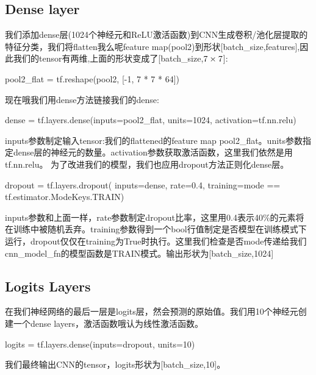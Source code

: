 \subsection{Dense layer}
我们添加dense层(1024个神经元和ReLU激活函数)到CNN生成卷积/池化层提取的特征分类，我们将flatten我么呢feature map(pool2)到形状[batch\_size,features],因此我们的tensor有两维,上面的形状变成了[batch\_size,$7\times7\time64$]:
\begin{python}
pool2_flat = tf.reshape(pool2, [-1, 7 * 7 * 64])
\end{python}
现在哦我们用dense方法链接我们的dense:
\begin{python}
dense = tf.layers.dense(inputs=pool2_flat, units=1024, activation=tf.nn.relu)
\end{python}
inputs参数制定输入tensor:我们的flattened的feature map pool2\_flat。units参数指定dense层的神经元的数量。activation参数获取激活函数，这里我们依然是用tf.nn.relu。
为了改进我们的模型，我们也应用dropout方法正则化dense层。
\begin{python}
dropout = tf.layers.dropout(
    inputs=dense, rate=0.4, training=mode == tf.estimator.ModeKeys.TRAIN)
\end{python}
inputs参数和上面一样，rate参数制定dropout比率，这里用0.4表示40\%的元素将在训练中被随机丢弃。training参数得到一个bool行值制定是否模型在训练模式下运行，dropout仅仅在training为True时执行。这里我们检查是否mode传递给我们cnn\_model\_fn的模型函数是TRAIN模式。输出形状为[batch\_size,1024]
\subsection{Logits Layers}
在我们神经网络的最后一层是logits层，然会预测的原始值。我们用10个神经元创建一个dense layers，激活函数哦认为线性激活函数。
\begin{python}
logits = tf.layers.dense(inputs=dropout, units=10)
\end{python}
我们最终输出CNN的tensor，logits形状为[batch\_size,10]。
